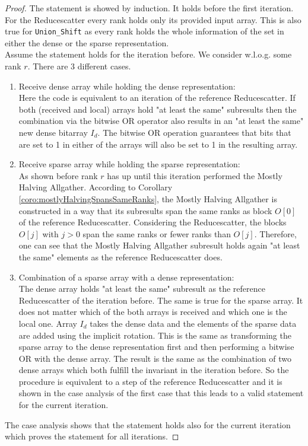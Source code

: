 \begin{proof}
	The statement is showed by induction. It holds before the first iteration. For the Reducescatter every rank holds only its provided input array. This is also true for \texttt{Union\_Shift} as every rank holds the whole information of the set in either the dense or the sparse representation.\\
	Assume the statement holds for the iteration before. We consider w.l.o.g. some rank $r$. There are 3 different cases. 
	\begin{enumerate}
		\item Receive dense array while holding the dense representation: \\
		Here the code is equivalent to an iteration of the reference Reducescatter. If both (received and local) arrays hold "at least the same" subresults then the combination via the bitwise OR operator also results in an "at least the same" new dense bitarray $I_d$. The bitwise OR operation guarantees that bits that are set to 1 in either of the arrays will also be set to 1 in the resulting array.
		
		\item Receive sparse array while holding the sparse representation: \\
		As shown before rank $r$ has up until this iteration performed the Mostly Halving Allgather. According to Corollary \ref{coro:mostlyHalvingSpansSameRanks}, the Mostly Halving Allgather is constructed in a way that its  subresults span the same ranks as block $O[0]$ of the reference Reducescatter. Considering the Reducescatter, the blocks  $O[j]$ with $j>0$ span the same ranks or fewer ranks than $O[j]$. Therefore, one can see that the Mostly Halving Allgather subresult holds again "at least the same" elements as the reference Reducescatter does.
		
		\item Combination of a sparse array with a dense representation:\\
		The dense array holds "at least the same"  subresult as the reference Reducescatter of the iteration before. The same is true for the sparse array. It does not matter which of the both arrays is received and which one is the local one. Array $I_d$ takes the dense data and the elements of the sparse data are added using the implicit rotation. This is the same as transforming the sparse array to the dense representation first and then performing a bitwise OR with the dense array. The result is the same as the combination of two dense arrays which both fulfill the invariant in the iteration before. So the procedure is equivalent to a step of the reference Reducescatter and it is shown in the case analysis of the first case that this leads to a valid statement for the current iteration.
	\end{enumerate}
	The case analysis shows that the statement holds also for the current iteration which proves the statement for all iterations.
\end{proof}
